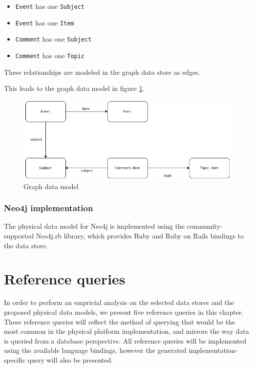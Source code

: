 \begin{itemize}
  \item \texttt{Event} has one \texttt{Subject}
  \item \texttt{Event} has one \texttt{Item}
  \item \texttt{Comment} has one \texttt{Subject}
  \item \texttt{Comment} has one \texttt{Topic}
\end{itemize}

These relationships are modeled in the graph data store as edges.

This leads to the graph data model in figure \ref{fig:graph-model}.

\begin{figure}
  \centering
  \includegraphics[width=.8\textwidth]{img/graph-model.png}
  \caption{Graph data model}
  \label{fig:graph-model}
\end{figure}

\subsubsection{Neo4j implementation}
\label{subsubsec:neo4j-implementation}

The physical data model for Neo4j is implemented using the community-supported Neo4j.rb library, which provides Ruby and Ruby on Rails bindings to the data store.

\section{Reference queries}
\label{sec:reference-queries}


In order to perform an empricial analysis on the selected data stores and the proposed physical data models, we present five reference queries in this chapter.
These reference queries will reflect the method of querying that would be the most common in the physical platform implementation, and mirrors the way data is queried from a database perspective.
All reference queries will be implemented using the available language bindings, however the generated implementation-specific query will also be presented.

